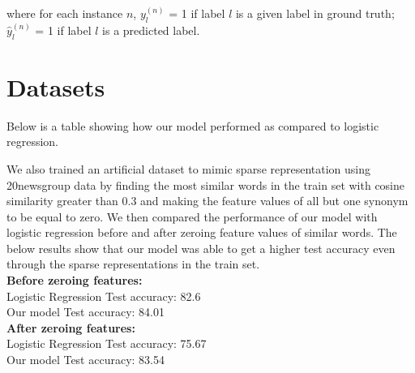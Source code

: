 \noindent where for each instance $n$, $y^{(n)}_{l}$ = 1 if label $l$ is a given label in ground truth; \\
$\hat{y}^{(n)}_{l}$ = 1 if label $l$ is a predicted label.

\section{Datasets}

Below is a table showing how our model performed as compared to logistic regression. 

\begin{table}[htbp]
\centering
{}
\caption{\label{tab:widgets}Set-Accuracy and Instance-F1 Results.}
\end{table}

\noindent We also trained an artificial dataset to mimic sparse representation using 20newsgroup data by finding the most similar words in the train set with cosine similarity greater than 0.3 and making the feature values of all but one synonym to be equal to zero. We then compared the performance of our model with logistic regression before and after zeroing feature values of similar words. The below results show that our model was able to get a higher test accuracy even through the sparse representations in the train set.\\

\noindent \textbf{Before zeroing features:}\\
Logistic Regression Test accuracy: 82.6\\
Our model Test accuracy: 84.01\\

\noindent \textbf{After zeroing features:}\\
Logistic Regression Test accuracy: 75.67\\
Our model Test accuracy: 83.54\\